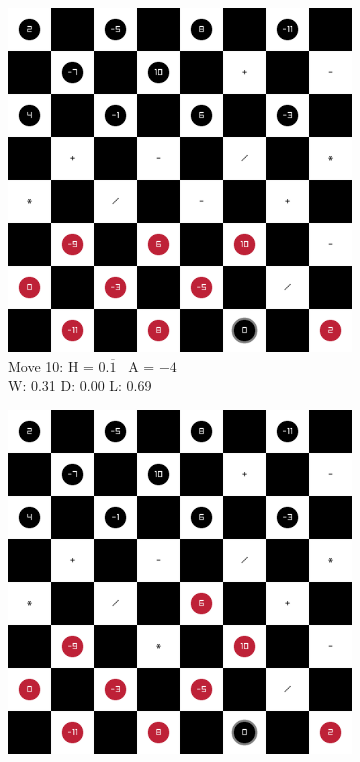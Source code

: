 \begin{figure}[H]
\begin{subfigure}{0.3\textwidth}
        \includegraphics[width=\textwidth]{images/games/game2/move_11.png}
        \caption*{Move 10: H = $0.\overline1$ \textbar\ A = $-4$ \\ W: 0.31 D: 0.00 L: 0.69}
    \end{subfigure}
    \quad
    \begin{subfigure}{0.3\textwidth}
        \centering
        \includegraphics[width=\textwidth]{images/games/game2/move_12.png}

\end{subfigure}
\end{figure}
